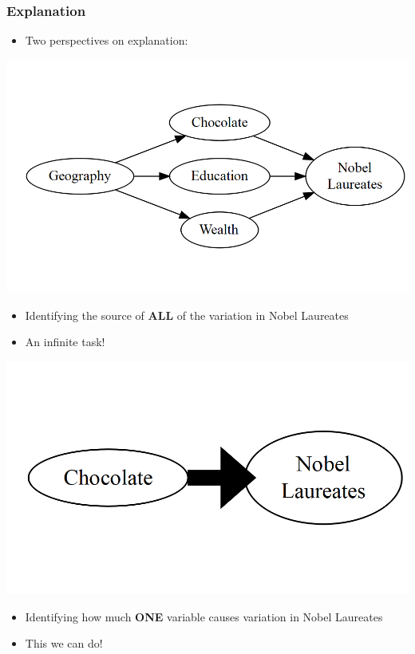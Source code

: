 \documentclass[xcolor=x11names,compress]{beamer}\usepackage[]{graphicx}\usepackage[]{color}
\makeatletter
\def\maxwidth{ %
  \ifdim\Gin@nat@width>\linewidth
    \linewidth
  \else
    \Gin@nat@width
  \fi
}
\newenvironment{knitrout}{}{} %
\renewcommand{\(}{\begin{columns}}
\renewcommand{\)}{\end{columns}}
\newcommand{\<}[1]{\begin{column}{#1}}
\renewcommand{\>}{\end{column}}
\makeatother
\begin{document}
\begin{frame}
\frametitle{Explanation}
\begin{itemize}
\item Two perspectives on explanation:
\end{itemize}
\begin{multicols}{2}
\begin{knitrout}
\color{fgcolor}
\includegraphics[width=\maxwidth]{figure/explanation1b-1} 

\end{knitrout}
\begin{itemize}
\item Identifying the source of \textbf{ALL} of the variation in Nobel Laureates
\item An infinite task!
\end{itemize}
\columnbreak
\begin{knitrout}
\color{fgcolor}
\includegraphics[width=\maxwidth]{figure/explanation2b-1} 

\end{knitrout}
\begin{itemize}
\item Identifying how much \textbf{ONE} variable causes variation in Nobel Laureates
\item This we can do!
\end{itemize}
\end{multicols}
\end{frame}
\end{document}
